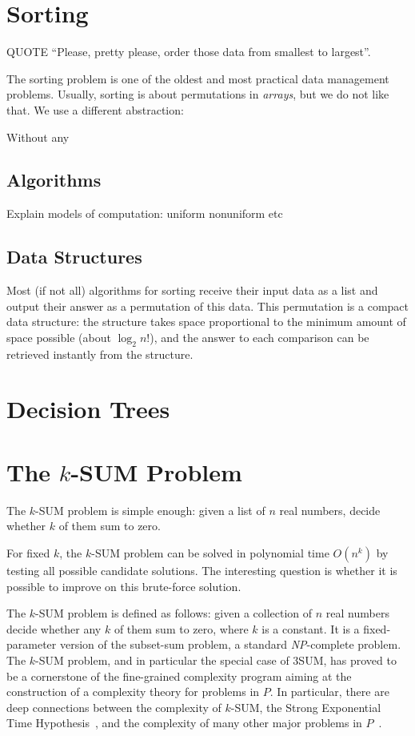 \chapter{Sorting}

QUOTE ``Please, pretty please, order those data from smallest to largest''.

The sorting problem is one of the oldest and most practical data management
problems.
%
Usually, sorting is about permutations in \emph{arrays}, but we do not like
that. We use a different abstraction:



Without any

\section{Algorithms}
Explain models of computation: uniform nonuniform etc

\section{Data Structures}

Most (if not all) algorithms for sorting receive their input data as a list and
output their answer as a permutation of this data. This permutation is a
compact data structure: the structure takes space proportional to the minimum
amount of space possible (about \(\log_2 n!\)), and the answer to each
comparison can be retrieved instantly from the structure.


\chapter{Decision Trees}

\chapter{The \(k\)-SUM Problem}

The \(k\)-SUM problem is simple enough: given a list of \(n\) real numbers,
decide whether \(k\) of them sum to zero.



For fixed \(k\), the \(k\)-SUM problem can be solved in polynomial time
\(O(n^k)\) by testing all possible candidate solutions.
The interesting question is whether it is possible to improve on
this brute-force solution.

The \(k\)-SUM problem is defined as follows: given a collection of $n$ real
numbers decide whether any $k$ of them sum to zero, where $k$ is a constant.
It is a fixed-parameter version of the subset-sum problem, a standard \textit{NP}-complete
problem. The \(k\)-SUM problem, and in particular the special case of 3SUM,
has proved to be a cornerstone of the fine-grained complexity program aiming at
the construction of a complexity theory for problems in $P$. In particular,
there are deep connections between the complexity of \(k\)-SUM, the Strong
Exponential Time Hypothesis~\cite{PW10,CGIMPS15}, and the complexity of many
other major problems in
$P$~\cite{GO95,BH99,MO01,P10,ACLL14,AVW14,GP14,KPP14,ALW14,AWY15,CL15}.

